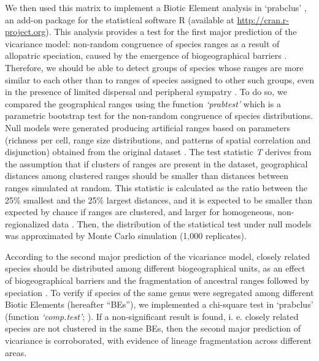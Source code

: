 \documentclass[12pt,openright,oneside,a4paper,english]{abntex2}
\begin{document}
We then used this matrix to implement a Biotic Element analysis in ‘prabclus’ \citep{Hausdorf2003, Hennig2020}, an add-on package for the statistical software R (available at \url{http://cran.r-project.org}). This analysis provides a test for the first major prediction of the vicariance model: non-random congruence of species ranges as a result of allopatric speciation, caused by the emergence of biogeographical barriers \citep{Hausdorf2006}. Therefore, we should be able to detect groups of species whose ranges are more similar to each other than to ranges of species assigned to other such groups, even in the presence of limited dispersal and peripheral sympatry \citep{Hausdorf2002, Hausdorf2003}. To do so, we compared the geographical ranges using the function \textit{‘prabtest’} which is a parametric bootstrap test for the non-random congruence of species distributions. Null models were generated producing artificial ranges based on parameters (richness per cell, range size distributions, and patterns of spatial correlation and disjunction) obtained from the original dataset \citep{Hennig2004}. The test statistic \textit{T} derives from the assumption that if clusters of ranges are present in the dataset, geographical distances among clustered ranges should be smaller than distances between ranges simulated at random. This statistic is calculated as the ratio between the 25\% smallest and the 25\% largest distances, and it is expected to be smaller than expected by chance if ranges are clustered, and larger for homogeneous, non-regionalized data \citep{Hennig2004}. Then, the distribution of the statistical test under null models was approximated by Monte Carlo simulation (1,000 replicates).

According to the second major prediction of the vicariance model, closely related species should be distributed among different biogeographical units, as an effect of biogeographical barriers and the fragmentation of ancestral ranges followed by speciation \citep{Wiley1988, Hausdorf2003, Hausdorf2006}. To verify if species of the same genus were segregated among different Biotic Elements (hereafter “BEs”), we implemented a chi-square test in ‘prabclus’ (function \textit{‘comp.test’}; \citealp[][]{Hennig2020}). If a non-significant result is found, i. e. closely related species are not clustered in the same BEs, then the second major prediction of vicariance is corroborated, with evidence of lineage fragmentation across different areas.
\end{document}
